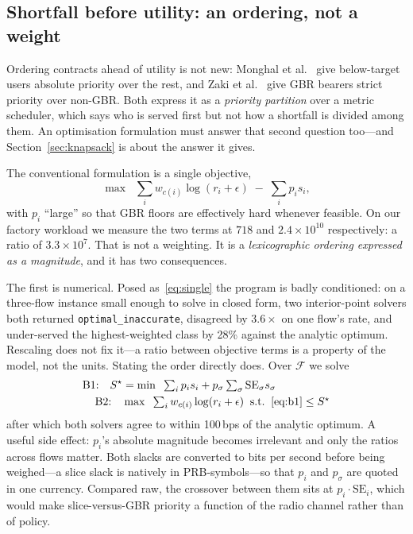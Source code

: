 \documentclass[conference]{IEEEtran}
\begin{document}
\subsection{Shortfall before utility: an ordering, not a weight}
\label{sec:lex}

Ordering contracts ahead of utility is not new: Monghal et
al.~\cite{monghal2008qos} give below-target users absolute priority over
the rest, and Zaki et al.~\cite{zaki2011multi} give GBR bearers strict
priority over non-GBR. Both express it as a \emph{priority partition} over
a metric scheduler, which says who is served first but not how a shortfall
is divided among them. An optimisation formulation must answer that second
question too---and Section~\ref{sec:knapsack} is about the answer it gives.

The conventional formulation is a single objective,
\begin{equation}
\max \;\; \textstyle\sum_i w_{c(i)} \log(r_i + \epsilon) \;-\; \sum_i p_i s_i ,
\label{eq:single}
\end{equation}
with $p_i$ ``large'' so that GBR floors are effectively hard whenever
feasible. On our factory workload we measure the two terms at $718$ and
$2.4\times10^{10}$ respectively: a ratio of $3.3\times10^{7}$. That is not
a weighting. It is a \emph{lexicographic ordering expressed as a
magnitude}, and it has two consequences.

The first is numerical. Posed as~\eqref{eq:single} the program is badly
conditioned: on a three-flow instance small enough to solve in closed form,
two interior-point solvers both returned \texttt{optimal\_inaccurate},
disagreed by $3.6\times$ on one flow's rate, and under-served the
highest-weighted class by 28\% against the analytic optimum. Rescaling does
not fix it---a ratio between objective terms is a property of the model, not
the units. Stating the order directly does. Over $\mathcal{F}$ we solve
\begin{align}
\text{B1:}\quad S^\star &= \min \;\; \textstyle\sum_i p_i s_i + p_\sigma \sum_\sigma \mathrm{SE}_\sigma s_\sigma
  \label{eq:b1}\\
\text{B2:}\quad &\max \;\; \textstyle\sum_i w_{c(i)}\log(r_i+\epsilon)
  \;\;\text{s.t.}\;\; \eqref{eq:b1} \le S^\star
  \label{eq:b2}
\end{align}
after which both solvers agree to within 100\,bps of the analytic optimum.
A useful side effect: $p_i$'s absolute magnitude becomes irrelevant and
only the ratios across flows matter. Both slacks are converted to bits per
second before being weighed---a slice slack is natively in PRB-symbols---so
that $p_i$ and $p_\sigma$ are quoted in one currency. Compared raw, the
crossover between them sits at $p_i \cdot \mathrm{SE}_i$, which would make
slice-versus-GBR priority a function of the radio channel rather than of
policy.
\end{document}
